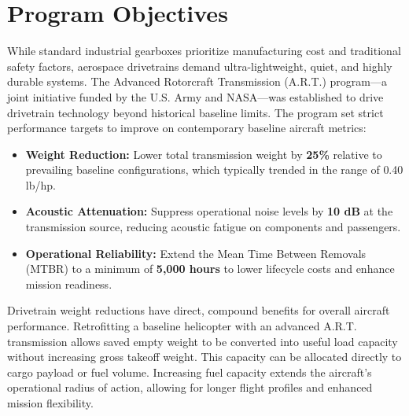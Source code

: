 \section{Program Objectives}
	While standard industrial gearboxes prioritize manufacturing cost and traditional safety factors, 
	aerospace drivetrains demand ultra-lightweight, quiet, and highly durable systems. The Advanced Rotorcraft 
	Transmission (A.R.T.) program—a joint initiative funded by the U.S. Army and NASA—was established to drive 
	drivetrain technology beyond historical baseline limits. The program set strict performance targets to improve 
	on contemporary baseline aircraft metrics: 
		\begin{itemize}
			\item \textbf{Weight Reduction:} Lower total transmission weight by \textbf{25\%} relative to prevailing baseline configurations, which typically trended in the range of 0.40 lb/hp.
			\item \textbf{Acoustic Attenuation:} Suppress operational noise levels by \textbf{10 dB} at the transmission source, reducing acoustic fatigue on components and passengers.
			\item \textbf{Operational Reliability:} Extend the Mean Time Between Removals (MTBR) to a minimum of \textbf{5,000 hours} to lower lifecycle costs and enhance mission readiness.
		\end{itemize}
	Drivetrain weight reductions have direct, compound benefits for overall aircraft performance. Retrofitting a 
	baseline helicopter with an advanced A.R.T. transmission allows saved empty weight to be converted into useful 
	load capacity without increasing gross takeoff weight. This capacity can be allocated directly to cargo payload 
	or fuel volume. Increasing fuel capacity extends the aircraft's operational radius of action, allowing for 
	longer flight profiles and enhanced mission flexibility. 

